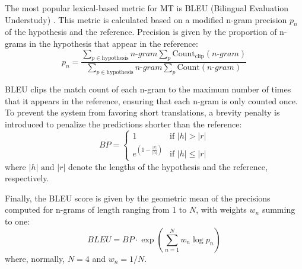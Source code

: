 \documentclass[11pt,english,listoffigures,listoftables]{tfgetsinf}
\begin{document}

The most popular lexical-based metric for MT is BLEU (Bilingual Evaluation Understudy) \cite{papineni-etal-2002-bleu}. This metric is calculated based on a modified n-gram precision $p_n$ of the hypothesis and the reference. Precision is given by the proportion of n-grams in the hypothesis that appear in the reference:
%
\begin{equation}
    p_n = \frac{\sum_{p \in \text{hypothesis}}\textit{n-gram} \sum_{p} \text{Count}_{\text{clip}}(\textit{n-gram})}{\sum_{p \in \text{hypothesis}} \textit{n-gram} \sum_{p} \text{Count}(\textit{n-gram})}    
\end{equation}

BLEU clips the match count of each n-gram to the maximum number of times that it appears in the reference, ensuring that each n-gram is only counted once. To prevent the system from favoring short translations, a brevity penalty is introduced to penalize the predictions shorter than the reference:
%
\begin{equation}
    BP = \begin{cases}
        1 & \text{if } |h| > |r| \\
        e^{\left(1-\frac{|r|}{|h|}\right)}
        & \text{if } |h| \leq |r|
    \end{cases}
\end{equation}
%
where $|h| \text{ and } |r|$ denote the lengths of the hypothesis and the reference, respectively.

Finally, the BLEU score is given by the geometric mean of the precisions computed for n-grams of length ranging from 1 to $N$, with weights $w_n$ summing to one:
%
\begin{equation}
    BLEU = BP \cdot \exp \left(\sum_{n=1}^N w_n \log p_n \right)
\end{equation}
%
where, normally, $ N = 4 $ and $w_n = 1/N$.




\end{document}
